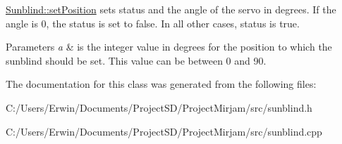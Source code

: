 \hyperlink{class_sunblind_aca584d938d6c28ec02d80fb287504434}{Sunblind\+::set\+Position} sets status and the angle of the servo in degrees. If the angle is 0, the status is set to false. In all other cases, status is true. 


\begin{DoxyParams}{Parameters}
{\em a} & is the integer value in degrees for the position to which the sunblind should be set. This value can be between 0 and 90. \\
\hline
\end{DoxyParams}


The documentation for this class was generated from the following files\+:\begin{DoxyCompactItemize}
\item 
C\+:/\+Users/\+Erwin/\+Documents/\+Project\+S\+D/\+Project\+Mirjam/src/sunblind.\+h\item 
C\+:/\+Users/\+Erwin/\+Documents/\+Project\+S\+D/\+Project\+Mirjam/src/sunblind.\+cpp\end{DoxyCompactItemize}
